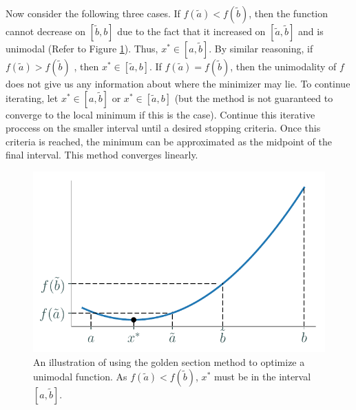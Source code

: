 Now consider the following three cases.
If $f(\tilde{a}) < f(\tilde{b})$, then the function cannot decrease on $[\tilde{b}, b]$ due to the fact that it increased on $[\tilde{a}, \tilde{b}]$ and is unimodal (Refer to Figure \ref{linesearch:gs}).
Thus, $x^*\in [a, \tilde{b}]$.
By similar reasoning, if $f(\tilde{a}) > f(\tilde{b})$ , then $x^* \in [\tilde{a}, b]$.
If $f(\tilde{a}) = f(\tilde{b})$, then the unimodality of $f$ does not give us any information about where the minimizer may lie.
To continue iterating, let $x^*\in [a, \tilde{b}]$ or $x^*\in[\tilde{a}, b]$ (but the method is not guaranteed to converge to the local minimum if this is the case).
Continue this iterative proccess on the smaller interval until a desired stopping criteria.
Once this criteria is reached, the minimum can be approximated as the midpoint of the final interval.
This method converges linearly.

\begin{figure}[H]
\centering
\includegraphics[width=.7\textwidth]{figures/golden_section.pdf}
\caption{An illustration of using the golden section method to optimize a unimodal function. As $f(\tilde{a}) < f(\tilde{b})$, $x^*$ must be in the interval $[a, \tilde{b}]$.}
\label{linesearch:gs}
\end{figure}

